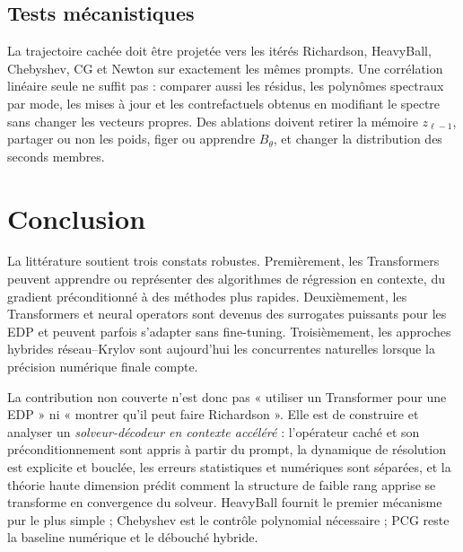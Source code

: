 \documentclass[11pt,a4paper]{article}
\begin{document}
\subsection{Tests mécanistiques}

La trajectoire cachée doit être projetée vers les itérés Richardson, HeavyBall,
Chebyshev, CG et Newton sur exactement les mêmes prompts. Une corrélation
linéaire seule ne suffit pas : comparer aussi les résidus, les polynômes
spectraux par mode, les mises à jour et les contrefactuels obtenus en modifiant
le spectre sans changer les vecteurs propres. Des ablations doivent retirer la
mémoire $z_{\ell-1}$, partager ou non les poids, figer ou apprendre
$B_\theta$, et changer la distribution des seconds membres.

\section{Conclusion}

La littérature soutient trois constats robustes. Premièrement, les Transformers
peuvent apprendre ou représenter des algorithmes de régression en contexte, du
gradient préconditionné à des méthodes plus rapides. Deuxièmement, les
Transformers et neural operators sont devenus des surrogates puissants pour les
EDP et peuvent parfois s'adapter sans fine-tuning. Troisièmement, les approches
hybrides réseau--Krylov sont aujourd'hui les concurrentes naturelles lorsque la
précision numérique finale compte.

La contribution non couverte n'est donc pas « utiliser un Transformer pour une
EDP » ni « montrer qu'il peut faire Richardson ». Elle est de construire et
analyser un \emph{solveur-décodeur en contexte accéléré} : l'opérateur caché et
son préconditionnement sont appris à partir du prompt, la dynamique de
résolution est explicite et bouclée, les erreurs statistiques et numériques
sont séparées, et la théorie haute dimension prédit comment la structure de
faible rang apprise se transforme en convergence du solveur. HeavyBall fournit
le premier mécanisme pur le plus simple ; Chebyshev est le contrôle polynomial
nécessaire ; PCG reste la baseline numérique et le débouché hybride.
\end{document}
